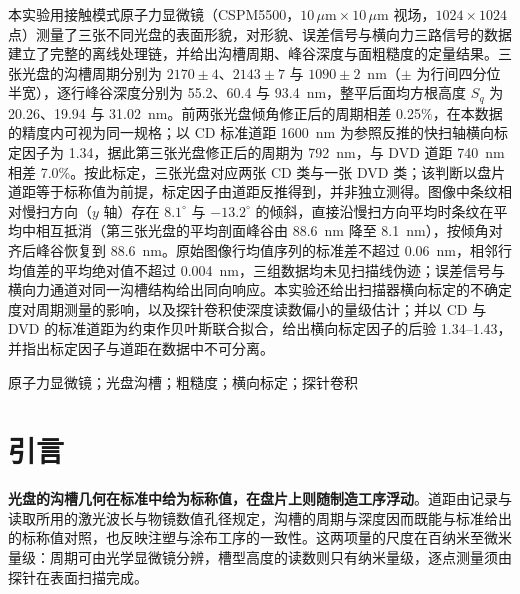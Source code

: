 \documentclass[12pt,a4paper,fontset=windows]{ctexart}
\begin{document}
本实验用接触模式原子力显微镜（CSPM5500，$10\,\mu\mathrm{m}\times10\,\mu\mathrm{m}$ 视场，$1024\times1024$ 点）测量了三张不同光盘的表面形貌，对形貌、误差信号与横向力三路信号的数据建立了完整的离线处理链，并给出沟槽周期、峰谷深度与面粗糙度的定量结果。三张光盘的沟槽周期分别为 $2170\pm4$、$2143\pm7$ 与 $1090\pm2$~nm（$\pm$ 为行间四分位半宽），逐行峰谷深度分别为 55.2、60.4 与 93.4~nm，整平后面均方根高度 $S_q$ 为 20.26、19.94 与 31.02~nm。前两张光盘倾角修正后的周期相差 0.25\%，在本数据的精度内可视为同一规格；以 CD 标准道距 1600~nm 为参照反推的快扫轴横向标定因子为 1.34，据此第三张光盘修正后的周期为 792~nm，与 DVD 道距 740~nm 相差 7.0\%。按此标定，三张光盘对应两张 CD 类与一张 DVD 类；该判断以盘片道距等于标称值为前提，标定因子由道距反推得到，并非独立测得。图像中条纹相对慢扫方向（$y$ 轴）存在 $8.1^\circ$ 与 $-13.2^\circ$ 的倾斜，直接沿慢扫方向平均时条纹在平均中相互抵消（第三张光盘的平均剖面峰谷由 88.6~nm 降至 8.1~nm），按倾角对齐后峰谷恢复到 88.6~nm。原始图像行均值序列的标准差不超过 0.06~nm，相邻行均值差的平均绝对值不超过 0.004~nm，三组数据均未见扫描线伪迹；误差信号与横向力通道对同一沟槽结构给出同向响应。本实验还给出扫描器横向标定的不确定度对周期测量的影响，以及探针卷积使深度读数偏小的量级估计；并以 CD 与 DVD 的标准道距为约束作贝叶斯联合拟合，给出横向标定因子的后验 1.34--1.43，并指出标定因子与道距在数据中不可分离。

\vspace{0.5cm}
\songti{}原子力显微镜；光盘沟槽；粗糙度；横向标定；探针卷积

\newpage

\tableofcontents
\thispagestyle{fancy}
\newpage
{}
\setcounter{page}{1}

\section{引言}

\textbf{光盘的沟槽几何在标准中给为标称值，在盘片上则随制造工序浮动}。道距由记录与读取所用的激光波长与物镜数值孔径规定，沟槽的周期与深度因而既能与标准给出的标称值对照，也反映注塑与涂布工序的一致性。这两项量的尺度在百纳米至微米量级：周期可由光学显微镜分辨，槽型高度的读数则只有纳米量级，逐点测量须由探针在表面扫描完成。
\end{document}
